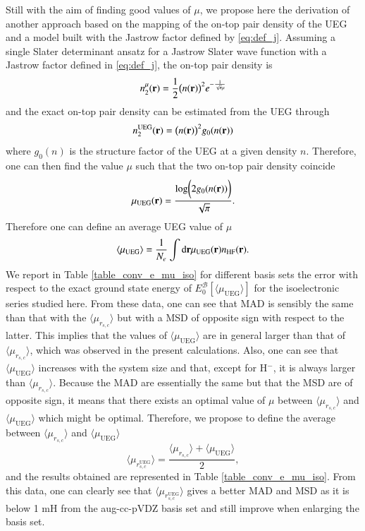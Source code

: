 \documentclass[aip,jcp,reprint,noshowkeys,superscriptaddress]{revtex4-1}
\newcommand{\basis}[0]{\mathcal{B}}
\newcommand{\muueg}{\mu_{\text{UEG}}}
\newcommand{\muuegav}{\langle \mu_{\text{UEG}}\rangle}
\newcommand{\murscav}{\langle \mu_{r_{s,c}}\rangle}
\newcommand{\mursclda}{\langle \mu_{r_{s,c}^{\text{UEG}}}\rangle}
\begin{document}
Still with the aim of finding good values of $\mu$, we propose here the derivation of another approach based on the mapping of the on-top pair density of the UEG and a model built with the Jastrow factor defined by \eqref{eq:def_j}. 
Assuming a single Slater determinant ansatz for a Jastrow Slater wave function with a Jastrow factor defined in \eqref{eq:def_j}, the on-top pair density is 
\begin{equation}
 n_2^\mu({\bf r}) = \frac{1}{2}\big(n({\bf r})\big)^2 e^{-\frac{1}{\sqrt{\pi}\mu}}
\end{equation}
and the exact on-top pair density can be estimated from the UEG through 
\begin{equation}
 n_2^{\text{UEG}}({\bf r}) = \big(n({\bf r})\big)^2g_0(n({\bf r}))
\end{equation}
where $g_0( n)$ is the structure factor of the UEG at a given density $n$. 
Therefore, one can then find the value $\mu$ such that the two on-top pair density coincide
\begin{equation}
 \muueg({\bf r}) = \frac{\text{log}\bigg(2 g_0(n({\bf r}))\bigg) }{\sqrt{\pi}}.
\end{equation}
Therefore one can define an average UEG value of $\mu$ 
\begin{equation}
 \label{eq:mu_av_ueg}
 \muuegav = \frac{1}{N_e}\int \text{d}{\bf r} \muueg({\bf r}) n_{\text{HF}}({\bf r}).
\end{equation}
We report in Table \ref{table_conv_e_mu_iso} for different basis sets the error with respect to the exact ground state energy of $E_0^{\basis}[\muuegav]$ for the isoelectronic series studied here. 
From these data, one can see that MAD is sensibly the same than that with the $\murscav$ but with a MSD of opposite sign with respect to the latter. This implies that the values of $\muuegav$ are in general larger than that of $\murscav$, which was observed in the present calculations. 
Also, one can see that $ \muuegav$ increases with the system size and that, except for H$^-$, it is always larger than $\murscav$. 
Because the MAD are essentially the same but that the MSD are of opposite sign, it means that there exists an optimal value of $\mu$ between $\murscav$ and $\muuegav$ which might be optimal. 
Therefore, we propose to define the average between $\murscav$ and $\muuegav$ 
\begin{equation}
 \label{eq:mu_av_ueg_rsc}
  \mursclda = \frac{\murscav   +   \muuegav }{2},
\end{equation}
and the results obtained are represented in Table \ref{table_conv_e_mu_iso}. From this data, one can clearly see that $\mursclda$ gives a better MAD and MSD as it is below 1 mH from the aug-cc-pVDZ basis set and still improve when enlarging the basis set. 
\end{document}
